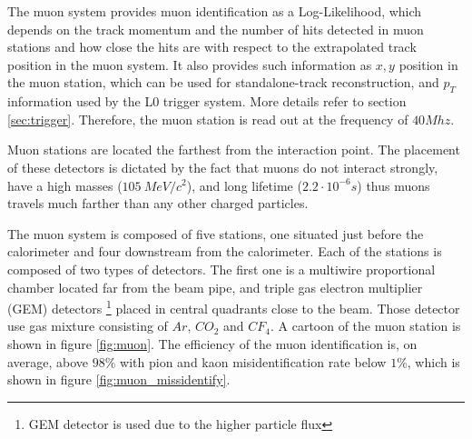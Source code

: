 The muon system provides muon identification as a Log-Likelihood, which depends on the track momentum and the number of hits detected in muon stations and how close the hits are with respect to the extrapolated track position in the muon system. It also provides such information as $x,y$ position in the muon station, which can be used for standalone-track reconstruction, and $p_T$ information used by the L0 trigger system. More details refer to section \ref{sec:trigger}. Therefore, the muon station is read out at the frequency of $40 Mhz$. 

Muon stations are located the farthest from the interaction point. The placement of these detectors is dictated by the fact that muons do not interact strongly, have a high masses ($105~ MeV/c^2$), and long lifetime ($2.2 \cdot 10^{-6}s$) thus muons travels much farther than any other charged particles.  
  
The muon system is composed of five stations, one situated just before the calorimeter and four downstream from the calorimeter. Each of the stations is composed of two types of detectors. The first one is a multiwire proportional chamber located far from the beam pipe, and triple gas electron multiplier (GEM) detectors \footnote{GEM detector is used due to the higher particle flux} placed in central quadrants close to the beam. Those detector use gas mixture consisting of $Ar$, $CO_2$ and $CF_4$. A cartoon of the muon station is shown in figure \ref{fig:muon}. 
The efficiency of the muon identification is, on average, above $98\%$ with pion and kaon misidentification rate below $1\%$, which is shown in figure \ref{fig:muon_missidentify}. 



